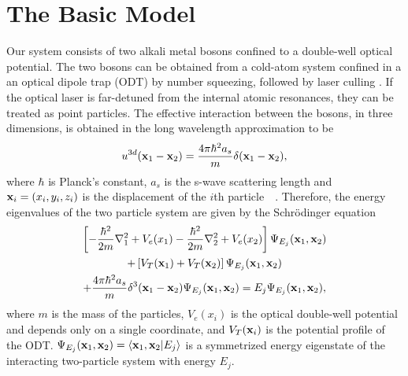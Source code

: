 \section{\label{sec:2} The Basic Model}
\label{chapter-dblwell:section:basicmodel}
%
Our system consists of  two alkali metal bosons confined to a double-well optical potential. The two bosons can be obtained from  a cold-atom system confined in a an optical dipole trap (ODT) by number squeezing, followed by laser culling . If the optical laser is far-detuned from the internal atomic resonances, they can be treated as point particles. The effective interaction between the bosons, in three dimensions, is obtained in the long wavelength approximation to be 
%
\begin{equation}
u^{3d}({\bf x}_1-{\bf x}_2)= \frac{4\pi\hbar^2 a_s}{m} \delta({\bf x}_1-{\bf x}_2),
\end{equation}
%
where ${\hbar}$ is Planck's constant, $a_s$ is the s-wave scattering length and ${\bf  x}_i = \left(  x_i,y_i,z_i \right) $ is the displacement of the $i$th particle~\cite{metcalf:vanderstraten}~\cite{pethick:bec}. Therefore, the energy eigenvalues of the two particle system are given by the Schr\"odinger equation 
%
\begin{multline}
\left[ -\frac{\hbar^2}{2m}\nabla^2_1 +V_e(x_1)-\frac{\hbar^2}{2m}\nabla^2_2 +V_e(x_2)\right] 
\Psi_{E_j}({\bf x}_1, {\bf x}_2) \\
 +  \left[V_T({\bf x}_1)+V_T({\bf x}_2)\right]\Psi_{E_j}({\bf x}_1, {\bf x}_2) \\
 +  \frac{4\pi\hbar^2 a_s}{m} \delta^3({\bf x}_1-{\bf x}_2)\Psi_{E_j}({\bf x}_1 ,{\bf x}_2) 
= E_j \Psi_{E_j}({\bf x}_1,{\bf x}_2) ,
\label{eq:3dsys}
\end{multline}
%
where $m$ is the mass of the particles, $V_e(x_i)$ is the optical double-well potential and depends only on a single coordinate, and $V_T({\bf x}_i)$ is the potential profile of the ODT. $\Psi_{E_j}({\bf x}_1,{\bf x}_2)={\langle}{\bf x}_1,{\bf x}_2|E_j{\rangle}$ is a symmetrized  energy eigenstate of the interacting two-particle system with energy $E_j$.

